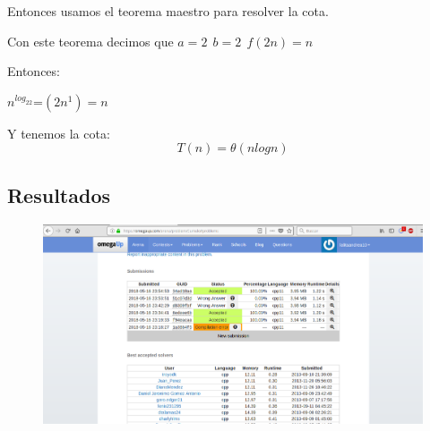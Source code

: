 \documentclass[12pt, fleqn]{article}                             %
\theoremstyle{break}                                            %
\begin{document}
Entonces usamos el teorema maestro para resolver la cota.

Con este teorema decimos que $a=2\:\:b=2\:\:f(2n)=n$

Entonces:


$n^{log_22}$=$(2n^1)=n$

Y tenemos la cota:
\begin{equation*}
    T(n)=\theta(nlogn)
\end{equation*}
\subsection{Resultados}
\begin{figure}[H]
               \centering
                \includegraphics[scale=.5]{DV3}
            \end{figure}
\end{document}
